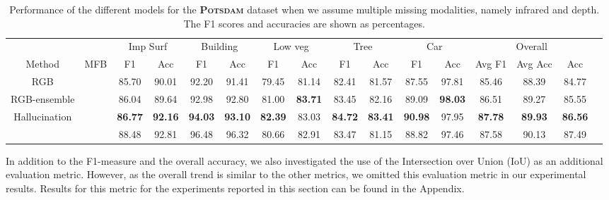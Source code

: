 \documentclass[journal]{IEEEtran}
\newcommand{\cmark}{\ding{51}}%
\begin{document}
\begin{table*}[t]
\begin{center}
\begin{tabular}{lc|c|c|c|c|c|c|c|c|c|c|c|c|c|c|}
\cline{3-15}
& & \multicolumn{2}{|c|}{Imp Surf} & \multicolumn{2}{c|}{Building} & \multicolumn{2}{c|}{Low veg} & \multicolumn{2}{c|}{Tree} & \multicolumn{2}{c|}{Car} & \multicolumn{3}{c|}{Overall}\\
\cline{1-15}
\multicolumn{1}{|c|}{Method} & \multicolumn{1}{|c|}{MFB} & F1 & Acc & F1 & Acc & F1 & Acc & F1 & Acc & F1 & Acc & Avg F1 & Avg Acc & Acc\\
\cline{1-15}
\multicolumn{1}{|c|}{RGB} & \cmark & 85.70 & 90.01 & 92.20 & 91.41 & 79.45 & 81.14 & 82.41 & 81.57 & 87.55 & 97.81 & 85.46 & 88.39 & 84.77\\
\cline{2-15}
\multicolumn{1}{|c|}{RGB-ensemble} & \cmark & 86.04 & 89.64 & 92.98 & 92.80 & 81.00 & {\bf83.71} & 83.45 & 82.16 & 89.09 & {\bf98.03} & 86.51 & 89.27 & 85.55\\
\cline{2-15}
\multicolumn{1}{|c|}{Hallucination} & \cmark & {\bf86.77} & {\bf92.16} & {\bf94.03} & {\bf93.10} & {\bf82.39} & 83.03 & {\bf84.72} & {\bf83.41} & {\bf90.98} & 97.95 & {\bf87.78} & {\bf89.93} & {\bf86.56}\\
\hdashline
\multicolumn{1}{|c|}{RGB\&I\&Depth} & \cmark & 88.48 & 92.81 & 96.48 & 96.32 & 80.66 & 82.91 & 83.47 & 81.15 & 88.82 & 97.46 & 87.58 & 90.13 & 87.49\\
\hline
\end{tabular}
\vspace{0.2cm}
\caption{Performance of the different models for the {\bf\scshape Potsdam} dataset when we assume multiple missing modalities, namely infrared and depth. The F1 scores and accuracies are shown as percentages.}
\label{tab:resultsMultiMissing}
\end{center}
\end{table*}

In addition to the F1-measure and the overall accuracy, we also investigated the use of the Intersection over Union (IoU) as an additional evaluation metric. However, as the overall trend is similar to the other metrics, we omitted this evaluation metric in our experimental results. Results for this metric for the experiments reported in this section can be found in the Appendix.
\end{document}
